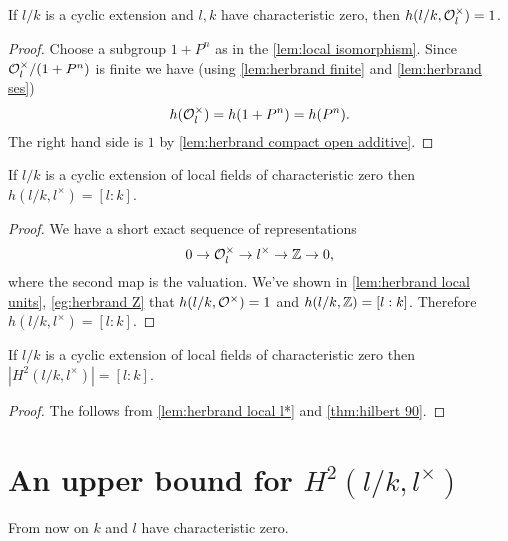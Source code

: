 \begin{lemma}\label{lem:herbrand local units}
	If $l/k$ is a cyclic extension and $l,k$ have characteristic zero,
	then $h(l/k, {\mathcal O}_l^\times) = 1$.
\end{lemma}

\begin{proof}
	Choose a subgroup $1+P^n$ as in the \ref{lem:local isomorphism}.
	Since ${\mathcal O}_l^\times / (1+P^n)$ is finite we have
	(using \ref{lem:herbrand finite} and \ref{lem:herbrand ses})
	\[
		h({\mathcal O}_l^\times) = h(1+P^n) = h(P^n).
	\]
	The right hand side is $1$ by \ref{lem:herbrand compact open additive}.
\end{proof}

\begin{lemma} \label{lem:herbrand local l*}
	If $l/k$ is a cyclic extension of local fields of characteristic zero
	then $h(l/k, l^\times)= [l:k]$.
\end{lemma}

\begin{proof}
	We have a short exact sequence of representations
	\[
		0 \to {\mathcal O}_l^\times \to l^\times \to {\mathbb Z} \to 0,
 	\]
	where the second map is the valuation.
	We've shown in \ref{lem:herbrand local units}, \ref{eg:herbrand Z}
	that $h(l/k,{\mathcal O}^\times)=1$ and $h(l/k,{\mathbb Z}) = [l:k]$.
	Therefore $h(l/k,l^\times) = [l:k]$.
\end{proof}


\begin{lemma} \label{lem:local H2 l*}
	If $l/k$ is a cyclic extension of local fields of characteristic zero
	then $|H^2(l/k,l^\times)| = [l:k]$.
\end{lemma}

\begin{proof}
	The follows from \ref{lem:herbrand local l*} and \ref{thm:hilbert 90}.
\end{proof}




\section{An upper bound for \texorpdfstring{$H^2(l/k,l^\times)$}{$H^2(l/k,l*)$}}

From now on $k$ and $l$ have characteristic zero.

